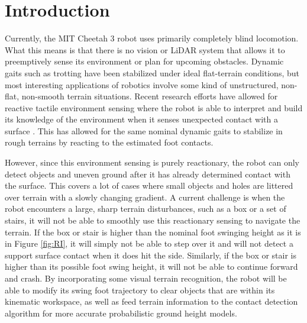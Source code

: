 
\section{Introduction}

Currently, the MIT Cheetah 3 robot uses primarily completely blind locomotion. What this means is that there is no vision or LiDAR system that allows it to preemptively sense its environment or plan for upcoming obstacles. Dynamic gaits such as trotting have been stabilized under ideal flat-terrain conditions, but most interesting applications of robotics involve some kind of unstructured, non-flat, non-smooth terrain situations. Recent research efforts have allowed for reactive tactile environment sensing where the robot is able to interpret and build its knowledge of the environment when it senses unexpected contact with a surface \cite{Bledt2018}. This has allowed for the same nominal dynamic gaits to stabilize in rough terrains by reacting to the estimated foot contacts. 

However, since this environment sensing is purely reactionary, the robot can only detect objects and uneven ground after it has already determined contact with the surface. This covers a lot of cases where small objects and holes are littered over terrain with a slowly changing gradient. A current challenge is when the robot encounters a large, sharp terrain disturbances, such as a box or a set of stairs, it will not be able to smoothly use this reactionary sensing to navigate the terrain. If the box or stair is higher than the nominal foot swinging height as it is in Figure \ref{fig:RI}, it will simply not be able to step over it and will not detect a support surface contact when it does hit the side. Similarly, if the box or stair is higher than its possible foot swing height, it will not be able to continue forward and crash. By incorporating some visual terrain recognition, the robot will be able to modify its swing foot trajectory to clear objects that are within its kinematic workspace, as well as feed terrain information to the contact detection algorithm for more accurate probabilistic ground height models.

